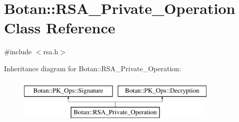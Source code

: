 \hypertarget{classBotan_1_1RSA__Private__Operation}{\section{Botan\-:\-:R\-S\-A\-\_\-\-Private\-\_\-\-Operation Class Reference}
\label{classBotan_1_1RSA__Private__Operation}
}


{\ttfamily \#include $<$rsa.\-h$>$}

Inheritance diagram for Botan\-:\-:R\-S\-A\-\_\-\-Private\-\_\-\-Operation\-:\begin{figure}[H]
\begin{center}
\leavevmode
\includegraphics[height=2.000000cm]{classBotan_1_1RSA__Private__Operation}
\end{center}
\end{figure}
